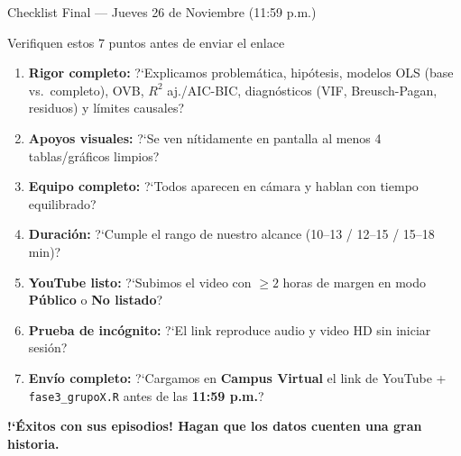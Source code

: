 \documentclass[aspectratio=169, 10pt]{beamer}
\begin{document}
\begin{frame}{Checklist Final --- Jueves 26 de Noviembre (11:59 p.m.)}
  \begin{block}{Verifiquen estos 7 puntos antes de enviar el enlace}
    \small
    \begin{enumerate}\setlength{\itemsep}{3.5pt}
      \item[$\square$] \textbf{Rigor completo:} ?`Explicamos problem\'atica, hip\'otesis, modelos OLS (base vs.\ completo), OVB, $R^2$ aj./AIC-BIC, diagn\'osticos (VIF, Breusch-Pagan, residuos) y l\'imites causales?
      \item[$\square$] \textbf{Apoyos visuales:} ?`Se ven n\'itidamente en pantalla al menos 4 tablas/gr\'aficos limpios?
      \item[$\square$] \textbf{Equipo completo:} ?`Todos aparecen en c\'amara y hablan con tiempo equilibrado?
      \item[$\square$] \textbf{Duraci\'on:} ?`Cumple el rango de nuestro alcance (10--13 / 12--15 / 15--18 min)?
      \item[$\square$] \textbf{YouTube listo:} ?`Subimos el video con $\ge 2$ horas de margen en modo \textbf{P\'ublico} o \textbf{No listado}?
      \item[$\square$] \textbf{Prueba de inc\'ognito:} ?`El link reproduce audio y video HD sin iniciar sesi\'on?
      \item[$\square$] \textbf{Env\'io completo:} ?`Cargamos en \textbf{Campus Virtual} el link de YouTube + \texttt{fase3\_grupoX.R} antes de las \textbf{11:59 p.m.}?
    \end{enumerate}
  \end{block}
  \vspace{4pt}
  \centering
  {\normalsize\textbf{\textcolor{javeriana}{!`\'Exitos con sus episodios! Hagan que los datos cuenten una gran historia.}}}
\end{frame}
\end{document}
